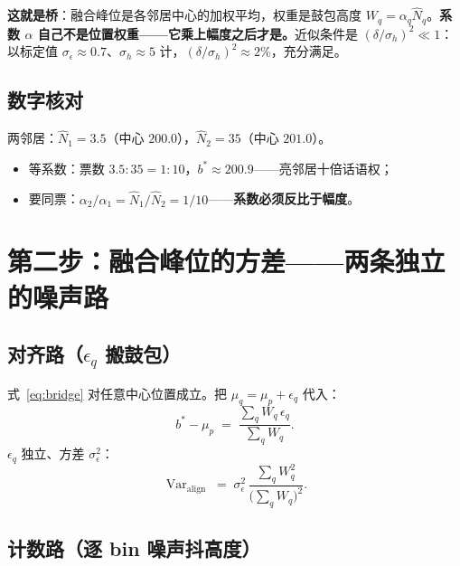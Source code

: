 \documentclass[11pt]{ctexart}
\newcommand{\Var}{\operatorname{Var}}
\begin{document}
\textbf{这就是桥}：融合峰位是各邻居中心的加权平均，权重是鼓包高度 $W_q=\alpha_q\hat N_q$。\textbf{系数 $\alpha$ 自己不是位置权重——它乘上幅度之后才是。}近似条件是 $(\delta/\sigma_h)^2\ll1$：以标定值 $\sigma_\epsilon\approx0.7$、$\sigma_h\approx5$ 计，$(\delta/\sigma_h)^2\approx2\%$，充分满足。

\subsection{数字核对}

两邻居：$\hat N_1=3.5$（中心 $200.0$），$\hat N_2=35$（中心 $201.0$）。
\begin{itemize}
  \item 等系数：票数 $3.5:35=1:10$，$b^*\approx200.9$——亮邻居十倍话语权；
  \item 要同票：$\alpha_2/\alpha_1=\hat N_1/\hat N_2=1/10$——\textbf{系数必须反比于幅度}。
\end{itemize}

\section{第二步：融合峰位的方差——两条独立的噪声路}

\subsection{对齐路（$\epsilon_q$ 搬鼓包）}

式~\eqref{eq:bridge} 对任意中心位置成立。把 $\mu_q=\mu_p+\epsilon_q$ 代入：
\begin{equation}
  b^*-\mu_p\;=\;\frac{\sum_q W_q\,\epsilon_q}{\sum_q W_q}.
\end{equation}
$\epsilon_q$ 独立、方差 $\sigma_\epsilon^2$：
\begin{equation}
  \Var_{\text{align}}\;=\;\sigma_\epsilon^2\,\frac{\sum_q W_q^2}{\big(\sum_q W_q\big)^2}.
  \label{eq:var_align}
\end{equation}

\subsection{计数路（逐 bin 噪声抖高度）}
\end{document}
